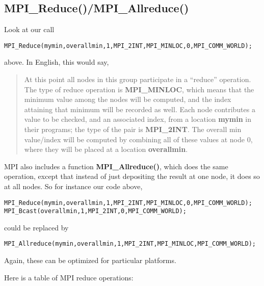 \subsection{MPI\_Reduce()/MPI\_Allreduce()}
\label{mpireduction}

Look at our call

\begin{Verbatim}[fontsize=\relsize{-2}]
MPI_Reduce(mymin,overallmin,1,MPI_2INT,MPI_MINLOC,0,MPI_COMM_WORLD);
\end{Verbatim}

above.  In English, this would say,

\begin{quote} At this point all nodes in this group participate in a
``reduce'' operation.  The type of reduce operation is {\bf
MPI\_MINLOC}, which means that the minimum value among the nodes will be
computed, and the index attaining that minimum will be recorded as well.
Each node contributes a value to be checked, and an associated index,
from a location {\bf mymin} in their programs; the type of the pair is
{\bf MPI\_2INT}.  The overall min value/index will be computed by
combining all of these values at node 0, where they will be placed at a
location {\bf overallmin}.  \end{quote}

MPI also includes a function {\bf MPI\_Allreduce()}, which does the same
operation, except that instead of just depositing the result at one
node, it does so at all nodes.  So for instance our code above,

\begin{Verbatim}[fontsize=\relsize{-2}]
MPI_Reduce(mymin,overallmin,1,MPI_2INT,MPI_MINLOC,0,MPI_COMM_WORLD);
MPI_Bcast(overallmin,1,MPI_2INT,0,MPI_COMM_WORLD);
\end{Verbatim}

could be replaced by

\begin{Verbatim}[fontsize=\relsize{-2}]
MPI_Allreduce(mymin,overallmin,1,MPI_2INT,MPI_MINLOC,MPI_COMM_WORLD);
\end{Verbatim}

Again, these can be optimized for particular platforms.

Here is a table of MPI reduce operations:

